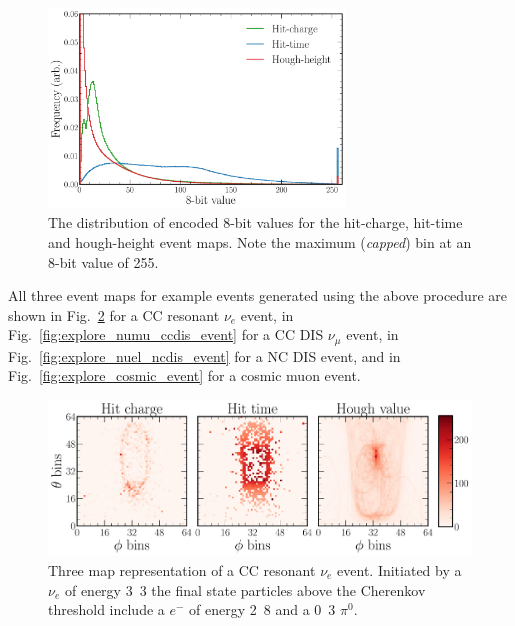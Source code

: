 \begin{figure} %
    \includegraphics[width=0.7\textwidth]{diagrams/7-results/explore_8_bit_range.pdf}
    \caption[Event map encoded 8-bit distributions]
    {The distribution of encoded 8-bit values for the hit-charge, hit-time and hough-height event
        maps. Note the maximum (\emph{capped}) bin at an 8-bit value of 255.}
    \label{fig:explore_8_bit_range}
\end{figure}

All three event maps for example events generated using the above procedure are shown in
Fig.~\ref{fig:explore_nuel_ccres_event} for a CC resonant $\nu_{e}$ event, in
Fig.~\ref{fig:explore_numu_ccdis_event} for a CC DIS $\nu_{\mu}$ event, in
Fig.~\ref{fig:explore_nuel_ncdis_event} for a NC DIS event, and in
Fig.~\ref{fig:explore_cosmic_event} for a cosmic muon event.

\begin{figure} %
    \includegraphics[width=\textwidth]{diagrams/7-results/explore_nuel_ccres_event.pdf}
    \caption[Example of a CC resonant $\nu_{e}$ event]
    {Three map representation of a CC resonant $\nu_{e}$ event. Initiated by a $\nu_{e}$ of
        energy \unit{3.3}{\GeV} the final state particles above the Cherenkov threshold include a
        $e^{-}$ of energy \unit{2.8}{\GeV} and a \unit{0.3}{\GeV} $\pi^{0}$.}
    \label{fig:explore_nuel_ccres_event}
\end{figure}

